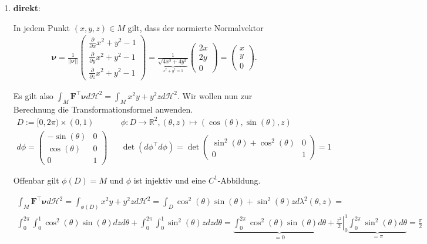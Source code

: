 \documentclass[]{article}
\begin{document}
\begin{enumerate}[label=(\roman*)]
	\item \textbf{direkt}:
	
	In jedem Punkt $(x,y,z) \in M$ gilt, dass der normierte Normalvektor
	\begin{align*}
		\bm{\nu} =
		\frac{1}{||\bm{\nu}||} \begin{pmatrix} \frac{\partial}{\partial x} x^2 + y^2 - 1\\ \frac{\partial}{\partial y} x^2 + y^2 - 1\\ \frac{\partial}{\partial z} x^2 + y^2 - 1 \end{pmatrix} =
		\frac{1}{\underbrace{\sqrt{4x^2 + 4y^2}}_{x^2+y^2=1} } \begin{pmatrix} 2x\\ 2y\\ 0 \end{pmatrix} = 
		\begin{pmatrix} x\\ y\\ 0 \end{pmatrix}.
	\end{align*}

	Es gilt also $\int_M \bm{F}^\top \bm{\nu} d\mathcal{H}^2 = \int_M x^2y + y^2z d\mathcal{H}^2$. Wir wollen nun zur Berechnung die Transformationsformel anwenden.
	\begin{align*}
		D := [0, 2\pi) \times (0,1) && \phi:D \rightarrow \mathbb{R}^2, (\theta, z) \mapsto (\cos(\theta), \sin(\theta), z)\\
		d\phi = \begin{pmatrix} -\sin(\theta) & 0 \\ \cos(\theta) & 0 \\ 0 & 1 \end{pmatrix} && \det(d\phi^\top d\phi) = \det\begin{pmatrix} \sin^2(\theta) + \cos^2(\theta) & 0 \\ 0 & 1 \end{pmatrix} = 1
	\end{align*}

	Offenbar gilt $\phi(D)=M$ und $\phi$ ist injektiv und eine $C^1$-Abbildung.

	\begin{align*}
		\int_M \bm{F}^\top \bm{\nu} d\mathcal{H}^2 = \int_{\phi(D)} x^2y + y^2z d\mathcal{H}^2 = \int_D \cos^2(\theta) \sin(\theta) + \sin^2(\theta) z d\lambda^2(\theta, z) =\\
		\int_{0}^{2\pi}\int_{0}^{1} \cos^2(\theta)\sin(\theta) dz d\theta + \int_{0}^{2\pi} \int_{0}^{1} \sin^2(\theta)z dz d\theta = \underbrace{\int_{0}^{2\pi} \cos^2(\theta) \sin(\theta) d\theta}_{=0} + \left.\frac{z^2}{2}\right\vert _0^1 \underbrace{\int_{0}^{2\pi} \sin^2(\theta) d\theta}_{=\pi} = \frac{\pi}{2}
	\end{align*}


\end{enumerate}
\end{document}
